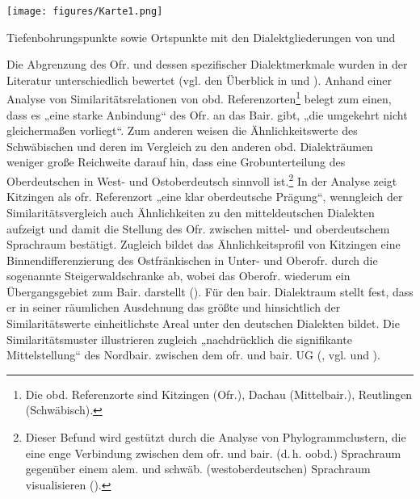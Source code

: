 \begin{map}
\texttt{[image: figures/Karte1.png]}
\caption{Tiefenbohrungspunkte sowie Ortspunkte mit den Dialektgliederungen von \citet[Karte 47.4, unten links]{Wiesinger1983b} und \citet[194, unten rechts]{Lameli2013}}
\label{map:1}
\end{map}

Die Abgrenzung des Ofr. und dessen spezifischer Dialektmerkmale wurden in der Literatur unterschiedlich bewertet (vgl. den Überblick in \citealt{Harnisch2019} und \citealt{Rowley1990a}). Anhand einer
Analyse von Similaritätsrelationen von obd. Referenzorten\footnote{Die obd. Referenzorte sind Kitzingen (Ofr.), Dachau (Mittelbair.), Reutlingen (Schwäbisch).} belegt \citet[168ff.]{Lameli2013} zum einen, dass es „eine starke Anbindung“ des Ofr. an das Bair. gibt, „die umgekehrt nicht gleichermaßen vorliegt“. Zum anderen weisen die Ähnlichkeitswerte des Schwäbischen und deren im Vergleich zu den anderen obd. Dialekträumen weniger große Reichweite darauf hin, dass eine Grobunterteilung des Oberdeutschen in West- und Ostoberdeutsch sinnvoll ist.\footnote{Dieser Befund wird gestützt durch die Analyse von Phylogrammclustern, die eine enge Verbindung zwischen dem ofr. und bair. (d.\,h. oobd.) Sprachraum gegenüber einem alem. und schwäb. (westoberdeutschen) Sprachraum visualisieren (\citealt[187f.]{Lameli2013}).} In der Analyse  zeigt Kitzingen als ofr. Referenzort „eine klar oberdeutsche Prägung“, wenngleich der Similaritätsvergleich auch Ähnlichkeiten zu den mitteldeutschen Dialekten aufzeigt und damit die Stellung des Ofr. zwischen mittel- und oberdeutschem Sprachraum bestätigt. Zugleich bildet das Ähnlichkeitsprofil von Kitzingen eine Binnendifferenzierung des Ostfränkischen in Unter- und Oberofr. durch die sogenannte Steigerwaldschranke ab, wobei das Oberofr. wiederum ein Übergangsgebiet zum Bair. darstellt (\citealt[203, FN 274]{Lameli2013}). Für den bair. Dialektraum stellt \citet[171]{Lameli2013} fest, dass er in seiner räumlichen Ausdehnung das größte und hinsichtlich der Similaritätswerte einheitlichste Areal unter den deutschen Dialekten bildet. Die Similaritätsmuster illustrieren zugleich „nachdrücklich die signifikante Mittelstellung“ des Nordbair. zwischen dem ofr. und bair. UG (\citealt[173]{Lameli2013}, vgl. \citealt[288--290]{Koch2019} und \citealt[171--174]{Rowley1997}).\largerpage[2]

